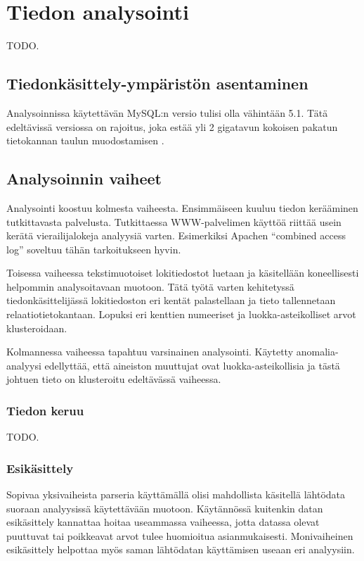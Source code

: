 
\chapter{Tiedon analysointi}

TODO.

\section{Tiedonkäsittely-ympäristön asentaminen}

Analysoinnissa käytettävän MySQL:n versio tulisi olla vähintään
5.1. Tätä edeltävissä versiossa on rajoitus, joka estää yli 2 gigatavun
kokoisen pakatun tietokannan taulun muodostamisen \cite{archive2g}.

\section{Analysoinnin vaiheet}

Analysointi koostuu kolmesta vaiheesta. Ensimmäiseen kuuluu tiedon
kerääminen tutkittavasta palvelusta. Tutkittaessa WWW-palvelimen
käyttöä riittää usein kerätä vierailijalokeja analyysiä
varten. Esimerkiksi Apachen ``combined access log'' soveltuu tähän
tarkoitukseen hyvin.

Toisessa vaiheessa tekstimuotoiset lokitiedostot luetaan ja
käsitellään koneellisesti helpommin analysoitavaan
muotoon. Tätä työtä varten kehitetyssä tiedonkäsittelijässä
lokitiedoston eri kentät palastellaan ja tieto tallennetaan
relaatiotietokantaan. Lopuksi eri kenttien numeeriset ja
luokka-asteikolliset arvot klusteroidaan.

Kolmannessa vaiheessa tapahtuu varsinainen analysointi. Käytetty
anomalia-analyysi edellyttää, että aineiston muuttujat ovat
luokka-asteikollisia ja tästä johtuen tieto on klusteroitu edeltävässä vaiheessa.

\subsection{Tiedon keruu}

TODO.

\subsection{Esikäsittely}

Sopivaa yksivaiheista parseria käyttämällä olisi mahdollista käsitellä
lähtödata suoraan analyysissä käytettävään muotoon. Käytännössä kuitenkin datan
esikäsittely kannattaa hoitaa useammassa vaiheessa, jotta datassa
olevat puuttuvat tai poikkeavat arvot tulee huomioitua
asianmukaisesti. Monivaiheinen esikäsittely helpottaa myös saman
lähtödatan käyttämisen useaan eri analyysiin.

